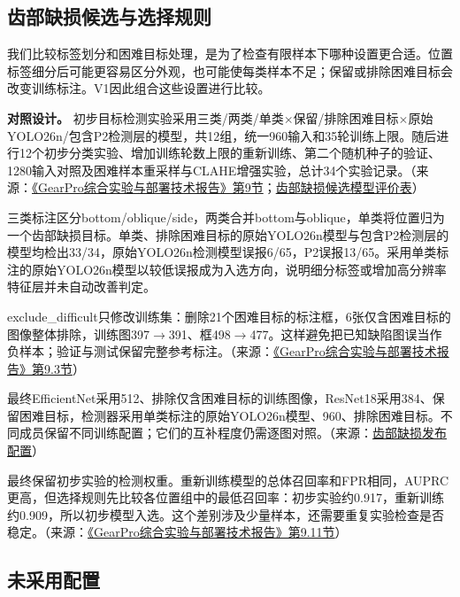 \FloatBarrier{}\subsection{齿部缺损候选与选择规则}
我们比较标签划分和困难目标处理，是为了检查有限样本下哪种设置更合适。位置标签细分后可能更容易区分外观，也可能使每类样本不足；保留或排除困难目标会改变训练标注。V1因此组合这些设置进行比较。

\textbf{对照设计。} 初步目标检测实验采用三类/两类/单类\ensuremath{\times}保留/排除困难目标\ensuremath{\times}原始YOLO26n/包含P2检测层的模型，共12组，统一960输入和35轮训练上限。随后进行12个初步分类实验、增加训练轮数上限的重新训练、第二个随机种子的验证、1280输入对照及困难样本重采样与CLAHE增强实验，总计34个实验记录。（来源：\protect\href{run:../../GearPro_综合技术报告_Markdown含配图/GearPro_综合实验与部署技术报告.md}{《GearPro综合实验与部署技术报告》第9节}；\protect\hyperlink{source-8}{齿部缺损候选模型评价表}）

三类标注区分bottom/oblique/side，两类合并bottom与oblique，单类将位置归为一个齿部缺损目标。单类、排除困难目标的原始YOLO26n模型与包含P2检测层的模型均检出33/34，原始YOLO26n检测模型误报6/65，P2误报13/65。采用单类标注的原始YOLO26n模型以较低误报成为入选方向，说明细分标签或增加高分辨率特征层并未自动改善判定。

exclude\_difficult只修改训练集：删除21个困难目标的标注框，6张仅含困难目标的图像整体排除，训练图397\ensuremath{\rightarrow}391、框498\ensuremath{\rightarrow}477。这样避免把已知缺陷图误当作负样本；验证与测试保留完整参考标注。（来源：\protect\href{run:../../GearPro_综合技术报告_Markdown含配图/GearPro_综合实验与部署技术报告.md}{《GearPro综合实验与部署技术报告》第9.3节}）

最终EfficientNet采用512、排除仅含困难目标的训练图像，ResNet18采用384、保留困难目标，检测器采用单类标注的原始YOLO26n模型、960、排除困难目标。不同成员保留不同训练配置；它们的互补程度仍需逐图对照。（来源：\protect\hyperlink{source-2}{齿部缺损发布配置}）

最终保留初步实验的检测权重。重新训练模型的总体召回率和FPR相同，AUPRC更高，但选择规则先比较各位置组中的最低召回率：初步实验约0.917，重新训练约0.909，所以初步模型入选。这个差别涉及少量样本，还需要重复实验检查是否稳定。（来源：\protect\href{run:../../GearPro_综合技术报告_Markdown含配图/GearPro_综合实验与部署技术报告.md}{《GearPro综合实验与部署技术报告》第9.11节}）

\FloatBarrier{}\subsection{未采用配置}

